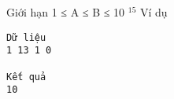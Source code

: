 Giới hạn
1 ≤ A ≤ B ≤ 10   $^    15   $
Ví dụ
\begin{verbatim}
Dữ liệu
1 13 1 0

Kết quả
10
\end{verbatim}